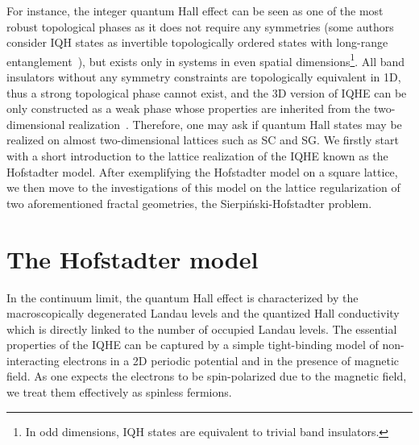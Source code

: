 For instance, the integer quantum Hall effect can be seen as one of the most robust topological phases as it does not require any symmetries (some authors consider IQH states as invertible topologically ordered states with long-range entanglement~\cite{kong2014braided, freed2014shortrange}), but exists only in systems in even spatial dimensions\footnote{In odd dimensions, IQH states are equivalent to trivial band insulators.}. All band insulators without any symmetry constraints are topologically equivalent in 1D, thus a strong topological phase cannot exist, and the 3D version of IQHE can be only constructed as a weak phase whose properties are inherited from the two-dimensional realization~\cite{10foldRyu2010, PhysRevLett.93.206602}. Therefore, one may ask if quantum Hall states may be realized on almost two-dimensional lattices such as SC and SG. We firstly start with a short introduction to the lattice realization of the IQHE known as the Hofstadter model. After exemplifying the Hofstadter model on a square lattice, we then move to the investigations of this model on the lattice regularization of two aforementioned fractal geometries, \ie the Sierpiński-Hofstadter problem.

\section{The Hofstadter model}
\label{sec:frac_model}
In the continuum limit, the quantum Hall effect is characterized by the macroscopically degenerated Landau levels and the quantized Hall conductivity which is directly linked to the number of occupied Landau levels. The essential properties of the IQHE can be captured by a simple tight-binding model of non-interacting electrons in a 2D periodic potential and in the presence of magnetic field. As one expects the electrons to be spin-polarized due to the magnetic field, we treat them effectively as spinless fermions. 


